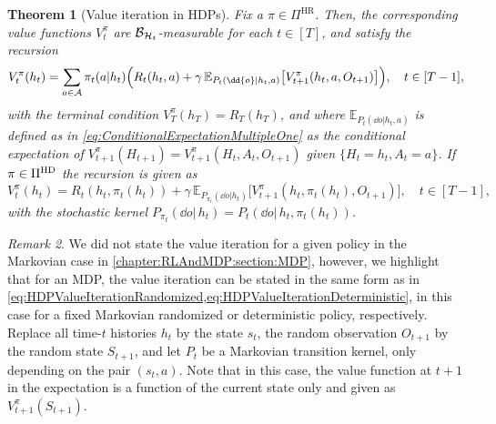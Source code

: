 \documentclass[
    a4paper,
    11pt,
    bibliography=totoc,
    listof=totoc,      
    headinclude=true,
    cleardoublepage=empty,
]{scrbook}
\theoremstyle{plain}
\newtheorem{theorem}{Theorem}[chapter]
\theoremstyle{definition}
\theoremstyle{remark}
\newtheorem{remark}[theorem]{Remark}
\newcommand{\E}{\mathbb E}
\newcommand{\SpaceA}{{\cal A}}
\newcommand{\SpaceH}{{\cal H}}
\begin{document}
\begin{theorem}[Value iteration in HDPs]
\label{thm:HPDValueIteration}
    Fix a $\pi\in\Pi^\text{HR}$. Then, the corresponding value 
    functions $V_t^\pi$ are $\mathcal{B}_{\SpaceH_t}$-measurable for each 
    $t\in[T]$, and satisfy the recursion
    \begin{equation}
    \label{eq:HDPValueIterationRandomized}
        V^\pi_t(h_t) 
        = \sum_{a\in\SpaceA} \pi_t(a|h_t) \Bigl(
            R_t(h_t, a) + \gamma \, 
            \E_{P_t(\dd{o}|h_t, a)} \bigl[
                V^\pi_{t+1}(h_t, a, O_{t+1})
            \bigr]
        \Bigr), \quad t\in[T-1],        
    \end{equation}
    with the terminal condition $V^\pi_T(h_T) = R_T(h_T)$, and where 
    $\E_{P_t(\dd o|h_t,a)}$ is defined as in 
    \cref{eq:ConditionalExpectationMultipleOne} as the conditional expectation 
    of $V^\pi_{t+1}(H_{t+1}) = V_{t+1}^\pi(H_t,A_t,O_{t+1})$ given $\{H_t=h_t, 
    A_t=a\}$. If $\pi\in\Pi^{\normalfont{\text{HD}}}$ the recursion is
    given as
    \begin{equation}
    \label{eq:HDPValueIterationDeterministic}
        V^\pi_t(h_t) 
        = R_t(h_t, \pi_t(h_t)) + \gamma \, 
        \E_{P_{\pi_t}(\dd{o}|h_t)} \bigl[
            V^\pi_{t+1}(h_t, \pi_t(h_t), O_{t+1})
        \bigr], \quad t\in[T-1],
    \end{equation}
    with the stochastic kernel $P_{\pi_t}(\dd{o}|\,h_t) = P_t(\dd{o}|\,h_t,
    \pi_t(h_t))$.
\end{theorem}
\begin{remark}
    We did not state the value iteration for a given policy in the Markovian case in \cref{chapter:RLAndMDP:section:MDP}, however, we highlight that for an MDP, the value iteration can be stated in the same form as in \cref{eq:HDPValueIterationRandomized,eq:HDPValueIterationDeterministic}, in this case for a fixed Markovian randomized or deterministic policy, respectively. Replace all time-$t$ histories $h_t$ by the state $s_t$, the random observation $O_{t+1}$ by the random state $S_{t+1}$, and let $P_t$ be a Markovian transition kernel, only depending on the pair $(s_t,a)$. Note that in this case, the value function at $t+1$ in the expectation is a function of the current state only and given as $V^\pi_{t+1}(S_{t+1})$.
\end{remark}
\end{document}
